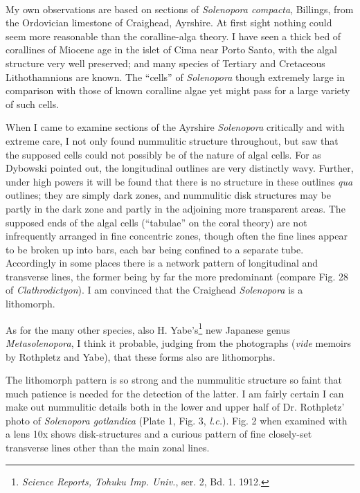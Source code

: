\documentclass[a4paper, 12pt, oneside, landscape]{article}
\begin{document}
\paragraph{}
My own observations are based on sections of \emph{Solenopora compacta}, Billings, from the Ordovician limestone of Craighead, Ayrshire. At first sight nothing could seem more reasonable than the coralline-alga theory. I have seen a thick bed of corallines of Miocene age in the islet of Cima near Porto Santo, with the algal structure very well preserved; and many species of Tertiary and Cretaceous Lithothamnions are known. The ``cells'' of \emph{Solenopora} though extremely large in comparison with those of known coralline algae yet might pass for a large variety of such cells.

When I came to examine sections of the Ayrshire \emph{Solenopora} critically and with extreme care, I not only found nummulitic structure throughout, but saw that the supposed cells could not possibly be of the nature of algal cells. For as Dybowski pointed out, the longitudinal outlines are very distinctly wavy. Further, under high powers it will be found that there is no structure in these outlines \emph{qua} outlines; they are simply dark zones, and nummulitic disk structures may be partly in the dark zone and partly in the adjoining more transparent areas. The supposed ends of the algal cells (``tabulae'' on the coral theory) are not infrequently arranged in fine concentric zones, though often the fine lines appear to be broken up into bars, each bar being confined to a separate tube. Accordingly in some places there is a network pattern of longitudinal and transverse lines, the former being by far the more predominant (compare Fig. 28 of \emph{Clathrodictyon}). I am convinced that the Craighead \emph{Solenopora} is a lithomorph.

As for the many other species, also H. Yabe's\footnote{\emph{Science Reports, Tohuku Imp. Univ.}, ser. 2, Bd. 1. 1912.} new Japanese genus \emph{Metasolenopora}, I think it probable, judging from the photographs (\emph{vide} memoirs by Rothpletz and Yabe), that these forms also are lithomorphs.

The lithomorph pattern is so strong and the nummulitic structure so faint that much patience is needed for the detection of the latter. I am fairly certain I can make out nummulitic details both in the lower and upper half of Dr. Rothpletz' photo of \emph{Solenopora gotlandica} (Plate 1, Fig. 3, \emph{l.c.}). Fig. 2 when examined with a lens 10x shows disk-structures and a curious pattern of fine closely-set transverse lines other than the main zonal lines.
\end{document}
